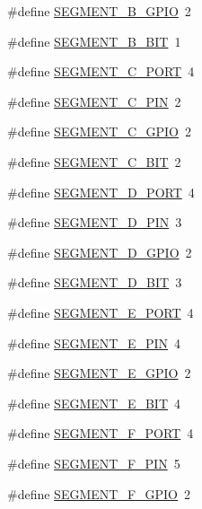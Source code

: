 \begin{DoxyCompactItemize}
\#define \hyperlink{group__hal_ga8999e65ed61b1e3f09f5304dbcb642ed}{S\+E\+G\+M\+E\+N\+T\+\_\+\+B\+\_\+\+G\+P\+IO}~2
\item 
\#define \hyperlink{group__hal_ga1fb8f15b7c6243abb7fe5afc76d0f3a7}{S\+E\+G\+M\+E\+N\+T\+\_\+\+B\+\_\+\+B\+IT}~1
\item 
\#define \hyperlink{group__hal_gab5bcfff6f04b87825f9cd41cc05dfb09}{S\+E\+G\+M\+E\+N\+T\+\_\+\+C\+\_\+\+P\+O\+RT}~4
\item 
\#define \hyperlink{group__hal_ga2d6f29896980f06a0f798b4a79acefe8}{S\+E\+G\+M\+E\+N\+T\+\_\+\+C\+\_\+\+P\+IN}~2
\item 
\#define \hyperlink{group__hal_ga4cfe4ae7353a040e72399dbfc61a67a3}{S\+E\+G\+M\+E\+N\+T\+\_\+\+C\+\_\+\+G\+P\+IO}~2
\item 
\#define \hyperlink{group__hal_ga50e05f6023b81a22375e3a3b3ca55075}{S\+E\+G\+M\+E\+N\+T\+\_\+\+C\+\_\+\+B\+IT}~2
\item 
\#define \hyperlink{group__hal_gabe61f02d46621e6c299da92a3f7fd334}{S\+E\+G\+M\+E\+N\+T\+\_\+\+D\+\_\+\+P\+O\+RT}~4
\item 
\#define \hyperlink{group__hal_gafec4d531aa5f0643836b0ea418197c05}{S\+E\+G\+M\+E\+N\+T\+\_\+\+D\+\_\+\+P\+IN}~3
\item 
\#define \hyperlink{group__hal_gab4e32d3448621c674df75f6561a3f193}{S\+E\+G\+M\+E\+N\+T\+\_\+\+D\+\_\+\+G\+P\+IO}~2
\item 
\#define \hyperlink{group__hal_gac28d8b2ab4ee6e397de66263de3e9d17}{S\+E\+G\+M\+E\+N\+T\+\_\+\+D\+\_\+\+B\+IT}~3
\item 
\#define \hyperlink{group__hal_gaa78d8374e4a2820b0f960c0eb08ec9af}{S\+E\+G\+M\+E\+N\+T\+\_\+\+E\+\_\+\+P\+O\+RT}~4
\item 
\#define \hyperlink{group__hal_ga21b8ebd5bdb756495bbd5020506e3dec}{S\+E\+G\+M\+E\+N\+T\+\_\+\+E\+\_\+\+P\+IN}~4
\item 
\#define \hyperlink{group__hal_gab421b06e7ab18dc5dd4ccee2159bf83e}{S\+E\+G\+M\+E\+N\+T\+\_\+\+E\+\_\+\+G\+P\+IO}~2
\item 
\#define \hyperlink{group__hal_ga8a940df92110f2842ca04f7284c527da}{S\+E\+G\+M\+E\+N\+T\+\_\+\+E\+\_\+\+B\+IT}~4
\item 
\#define \hyperlink{group__hal_ga0b8cd72e840f8d84d40a207717e5096c}{S\+E\+G\+M\+E\+N\+T\+\_\+\+F\+\_\+\+P\+O\+RT}~4
\item 
\#define \hyperlink{group__hal_gab0c22941f3ad67bc6e58c1180fb4ee2f}{S\+E\+G\+M\+E\+N\+T\+\_\+\+F\+\_\+\+P\+IN}~5
\item 
\#define \hyperlink{group__hal_ga78861fb42c43e8eccd9f9c89197846ca}{S\+E\+G\+M\+E\+N\+T\+\_\+\+F\+\_\+\+G\+P\+IO}~2

\end{DoxyCompactItemize}

